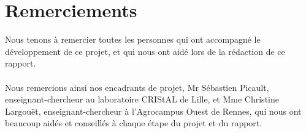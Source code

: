 \chapter*{Remerciements}

Nous tenons à remercier toutes les personnes qui ont accompagné le développement de ce projet, et qui nous ont aidé lors de la rédaction de ce rapport.
\\
\\
Nous remercions ainsi nos encadrants de projet, Mr Sébastien Picault, enseignant-chercheur au laboratoire CRIStAL de Lille, et Mme Christine Largouët, enseignant-chercheur à l'Agrocampus Ouest de Rennes, qui nous ont beaucoup aidés et conseillés à chaque étape du projet et du rapport.